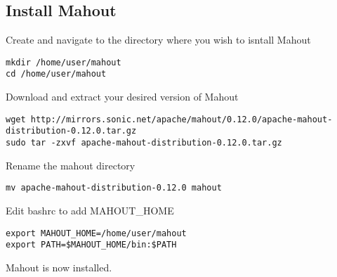 \subsection{Install Mahout}

Create and navigate to the directory where you wish to isntall Mahout

\begin{lstlisting}
mkdir /home/user/mahout
cd /home/user/mahout
\end{lstlisting}

Download and extract your desired version of Mahout

\begin{lstlisting}
wget http://mirrors.sonic.net/apache/mahout/0.12.0/apache-mahout-distribution-0.12.0.tar.gz
sudo tar -zxvf apache-mahout-distribution-0.12.0.tar.gz
\end{lstlisting}

Rename the mahout directory

\begin{lstlisting}
mv apache-mahout-distribution-0.12.0 mahout
\end{lstlisting}

Edit bashrc to add MAHOUT\_HOME

\begin{lstlisting}
export MAHOUT_HOME=/home/user/mahout
export PATH=$MAHOUT_HOME/bin:$PATH
\end{lstlisting}

Mahout is now installed.

